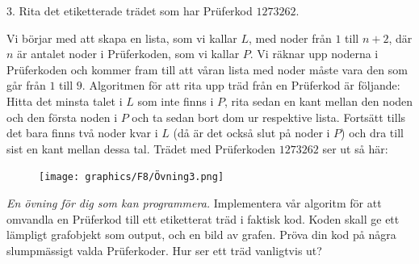 \documentclass[nobib]{tufte-handout}
\begin{document}
\begin{xca}
    3. Rita det etiketterade trädet som har Prüferkod $1273262$.\\
\end{xca}
\begin{solution} Vi börjar med att skapa en lista, som vi kallar $L$, med noder från $1$ till $n+2$, där $n$ är antalet noder i Prüferkoden, som vi kallar $P$. Vi räknar upp noderna i Prüferkoden och kommer fram till att våran lista med noder måste vara den som går från $1$ till $9$. Algoritmen för att rita upp träd från en Prüferkod är följande: Hitta det minsta talet i $L$ som inte finns i $P$, rita sedan en kant mellan den noden och den första noden i $P$ och ta sedan bort dom ur respektive lista. Fortsätt tills det bara finns två noder kvar i $L$ (då är det också slut på noder i $P$) och dra till sist en kant mellan dessa tal. Trädet med Prüferkoden $1273262$ ser ut så här:
    \begin{figure}
        
        \texttt{[image: graphics/F8/Övning3.png]}
        
        \label{fig:python3_prufer_graph1}
\end{figure}
\end{solution}



\newpage\begin{xca}
    
    
    \emph{En övning för dig som kan programmera.} Implementera vår algoritm för att omvandla en Prüferkod till ett etiketterat träd i faktisk kod. Koden skall ge ett lämpligt grafobjekt som output, och en bild av grafen. Pröva din kod på några slumpmässigt valda Prüferkoder. Hur ser ett träd vanligtvis ut?
\end{xca}
\end{document}
